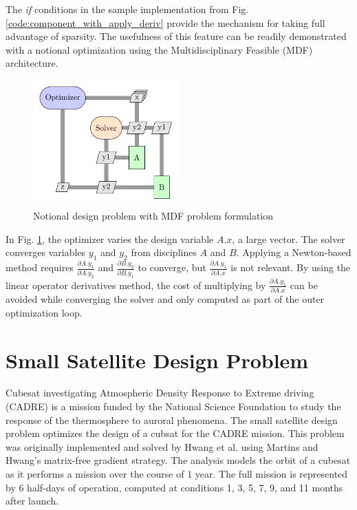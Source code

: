 \documentclass[]{aiaa-tc} %
\begin{document}
    The \textit{if} conditions in the sample implementation from Fig. \ref{code:component_with_apply_deriv} provide the
    mechanism for taking full advantage of sparsity. The usefulness of this feature can be readily demonstrated with
    a notional optimization using the Multidisciplinary Feasible (MDF) architecture\cite{martins:arch:survey}.

    \begin{figure}[htbp]
        \centering
        \includegraphics[width=0.5\textwidth]{xdsm/mdf_sample}
        \caption{Notional design problem with MDF problem formulation}
        \label{fig:MDF:XDSM}
    \end{figure}

    In Fig. \ref{fig:MDF:XDSM}, the optimizer varies the design variable $A.x$, a large vector.
    The solver converges variables $y_1$ and $y_2$ from disciplines $A$ and $B$. Applying a
    Newton-based method requires $\frac{\partial A.y_1}{\partial A.y_2}$ and $\frac{\partial B.y_2}{\partial B.y_1}$
    to converge, but $\frac{\partial A.y_1}{\partial A.x}$ is not relevant. By using the linear operator derivatives method,
    the cost of multiplying by $\frac{\partial A.y_1}{\partial A.x}$ can be avoided while converging the solver and only
    computed as part of the outer optimization loop.

    \section{Small Satellite Design Problem}

    Cubesat investigating Atmospheric Density Response to Extreme driving (CADRE)
    is a mission funded by the National Science Foundation to study the
    response of the thermosphere to auroral phenomena\cite{cutler2011cubesat}.
    The small satellite design problem optimizes the design of a cubsat for the CADRE mission.
    This problem was originally implemented and solved by Hwang et al.\cite{CADRE2012} using
    Martins and Hwang's matrix-free gradient strategy. The analysis models the orbit of a cubesat
    as it performs a mission over the course of 1 year. The full mission is represented
    by 6 half-days of operation, computed at conditions 1, 3, 5, 7, 9, and 11 months after launch.
\end{document}
